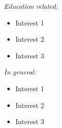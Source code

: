 \documentclass[a4paper]{cv-michele}
\begin{document}
\begin{minipage}[t]{0.23\linewidth}



\textsl{Education related:}
\begin{itemize}\itemsep0em
\item Interest 1
\item Interest 2
\item Interest 3
\end{itemize}

\textsl{In general:}
\begin{itemize}\itemsep0em
\item Interest 1
\item Interest 2
\item Interest 3
\end{itemize}

\end{minipage}
\hfill
\end{document}
